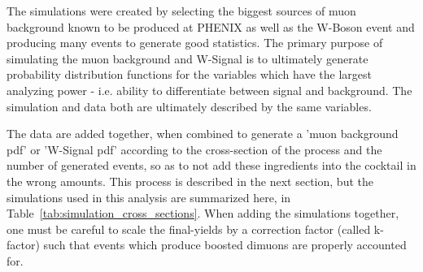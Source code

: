 The simulations were created by selecting the biggest sources of muon
background known to be produced at PHENIX as well as the W-Boson event and
producing many events to generate good statistics. The primary purpose of
simulating the muon background and W-Signal is to ultimately generate
probability distribution functions for the variables which have the largest
analyzing power - i.e. ability to differentiate between signal and background.
The simulation and data both are ultimately described by the same variables.

The data are added together, when combined to generate a 'muon background pdf'
or 'W-Signal pdf' according to the cross-section of the process and the number
of generated events, so as to not add these ingredients into the cocktail in the
wrong amounts. This process is described in the next section, but the
simulations used in this analysis are summarized here, in
Table~\ref{tab:simulation_cross_sections}. When adding the simulations together,
one must be careful to scale the final-yields by a correction factor (called
k-factor) such that events which produce boosted dimuons are properly accounted
for.

